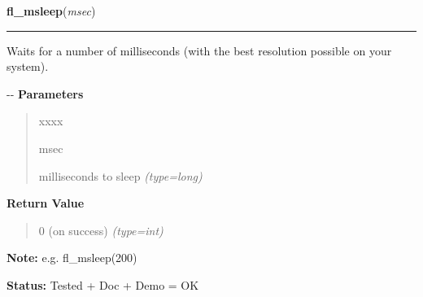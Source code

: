     \label{xformslib:flbasic:fl_msleep}

    \vspace{0.5ex}

\hspace{.8\funcindent}\begin{boxedminipage}{\funcwidth}

    \raggedright \textbf{fl\_msleep}(\textit{msec})

    \vspace{-1.5ex}

    \rule{\textwidth}{0.5\fboxrule}
\setlength{\parskip}{2ex}

Waits for a number of milliseconds (with the best resolution possible
on your system).

-{}-
\setlength{\parskip}{1ex}
      \textbf{Parameters}
      \vspace{-1ex}

      \begin{quote}
        \begin{Ventry}{xxxx}

          \item[msec]


milliseconds to sleep
            {\it (type=long)}

        \end{Ventry}

      \end{quote}

      \textbf{Return Value}
    \vspace{-1ex}

      \begin{quote}

0 (on success)
      {\it (type=int)}

      \end{quote}

\textbf{Note:} 
e.g. fl\_msleep(200)


\textbf{Status:} 
Tested + Doc + Demo = OK


    \end{boxedminipage}

    \label{xformslib:flbasic:fl_is_same_object}

    \vspace{0.5ex}

